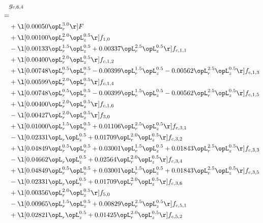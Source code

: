 \begin{alignat}{2} 
\label{eq:g_64_0} 
& g_{c,6,4} \nonumber \\ 
 = \\ 
& + \l[  0.00050 \opL_r^{3.0}  \r] F \nonumber \\ 
& + \l[  0.00100 \opL_r^{2.0} \opL_z^{0.5}  \r] f_{1,0} \nonumber \\ 
& - \l[  0.00133 \opL_r^{1.5} \opL_z^{0.5} +  0.00337 \opL_r^{2.5} \opL_z^{0.5}  \r] f_{c,1,1} \nonumber \\ 
& + \l[  0.00400 \opL_r^{2.0} \opL_z^{0.5}  \r] f_{c,1,2} \nonumber \\ 
& + \l[  0.00748 \opL_r^{0.5} \opL_z^{0.5}   -0.00399 \opL_r^{1.5} \opL_z^{0.5}   -0.00562 \opL_r^{2.5} \opL_z^{0.5}  \r] f_{c,1,3} \nonumber \\ 
& + \l[  0.00599 \opL_r^{2.0} \opL_z^{0.5}  \r] f_{c,1,4} \nonumber \\ 
& + \l[  0.00748 \opL_r^{0.5} \opL_z^{0.5}   -0.00399 \opL_r^{1.5} \opL_z^{0.5}   -0.00562 \opL_r^{2.5} \opL_z^{0.5}  \r] f_{c,1,5} \nonumber \\ 
& + \l[  0.00400 \opL_r^{2.0} \opL_z^{0.5}  \r] f_{c,1,6} \nonumber \\ 
& - \l[  0.00427 \opL_r^{2.0} \opL_z^{0.5}  \r] f_{3,0} \nonumber \\ 
& + \l[  0.01000 \opL_r^{1.5} \opL_z^{0.5} +  0.01106 \opL_r^{2.5} \opL_z^{0.5}  \r] f_{c,3,1} \nonumber \\ 
& - \l[  0.02331 \opL_r \opL_z^{0.5} +  0.01709 \opL_r^{2.0} \opL_z^{0.5}  \r] f_{c,3,2} \nonumber \\ 
& + \l[  0.04849 \opL_r^{0.5} \opL_z^{0.5} +  0.03001 \opL_r^{1.5} \opL_z^{0.5} +  0.01843 \opL_r^{2.5} \opL_z^{0.5}  \r] f_{c,3,3} \nonumber \\ 
& - \l[  0.04662 \opL_r \opL_z^{0.5} +  0.02564 \opL_r^{2.0} \opL_z^{0.5}  \r] f_{c,3,4} \nonumber \\ 
& + \l[  0.04849 \opL_r^{0.5} \opL_z^{0.5} +  0.03001 \opL_r^{1.5} \opL_z^{0.5} +  0.01843 \opL_r^{2.5} \opL_z^{0.5}  \r] f_{c,3,5} \nonumber \\ 
& - \l[  0.02331 \opL_r \opL_z^{0.5} +  0.01709 \opL_r^{2.0} \opL_z^{0.5}  \r] f_{c,3,6} \nonumber \\ 
& + \l[  0.00356 \opL_r^{2.0} \opL_z^{0.5}  \r] f_{5,0} \nonumber \\ 
& - \l[  0.00965 \opL_r^{1.5} \opL_z^{0.5} +  0.00829 \opL_r^{2.5} \opL_z^{0.5}  \r] f_{c,5,1} \nonumber \\ 
& + \l[  0.02821 \opL_r \opL_z^{0.5} +  0.01425 \opL_r^{2.0} \opL_z^{0.5}  \r] f_{c,5,2} \nonumber \\ 

\end{alignat}
